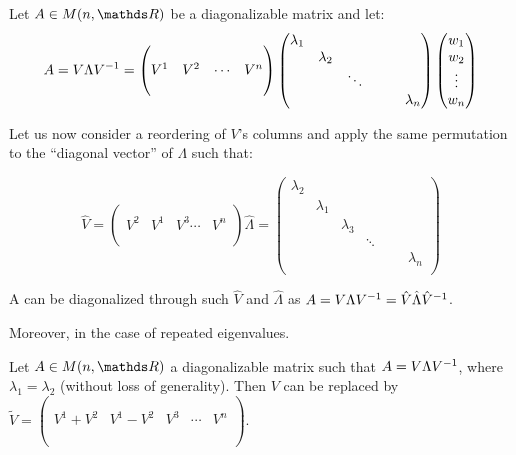 \documentclass[ComputationalMathematics.tex]{subfiles}
\begin{document}
\begin{proposition}
  Let $A \in M(n, \R)$ be a diagonalizable matrix and let:
  \[
    A=V\Lambda {V}^{-1} = \begin{pmatrix}
    \\
    V^1 & V^2 & \cdots & V^n\\
    \\
  \end{pmatrix} 
  \begin{pmatrix}
    \lambda_1\\
    &\lambda_2\\
    && \ddots\\
    &&&&&\lambda_n\\
  \end{pmatrix}
  \begin{pmatrix}
    w_1\\
    w_2\\
    \vdots\\
    w_n\\
  \end{pmatrix}
\]

  Let us now consider a reordering of $V$'s columns and apply the same permutation to the ``diagonal vector'' of $\Lambda$ such that:
  
\[
    \hat{V} = \begin{pmatrix}
    \\
    V^2 & V^1 & V^3 \cdots & V^n\\
    \\
  \end{pmatrix}
  \hat{\Lambda}= \begin{pmatrix}
    \lambda_2\\
    &\lambda_1\\
    &&\lambda_3\\
    &&& \ddots\\
    &&&&&&\lambda_n\\
  \end{pmatrix}
\]

  A can be diagonalized through such $\hat{V}$ and $\hat{\Lambda}$ as $A = V \Lambda {V}^{-1} = \hat{V} \hat{\Lambda} {\hat{V}}^{-1}$.
\end{proposition}

Moreover, in the case of repeated eigenvalues.

\begin{proposition}
  Let $A \in M(n, \R)$ a diagonalizable matrix such that $A = V \Lambda {V}^{-1}$, where $\lambda_1 = \lambda_2$ (without loss of generality). Then $V$ can be replaced by $\widetilde{V} = \begin{pmatrix}
    \\
    \\
    V^1 + V^2 & V^1 - V^2 & V^3 & \cdots & V^n\\
    \\
    \\
  \end{pmatrix}$.
\end{proposition}
\end{document}
